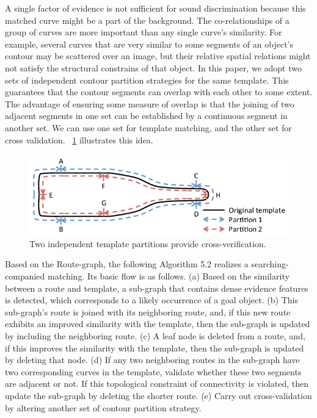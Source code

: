 \documentclass{article}
\begin{document}
A single factor of evidence is not sufficient for sound discrimination because this matched curve might be a part of the background. 
The co-relationships of a group of curves are more important than any single curve's similarity. 
For example, several curves that are very similar to some segments of an object's contour may be scattered over an image, but their relative spatial relations might not satisfy the structural constrains of that object. 
In this paper, we adopt two sets of independent contour partition strategies for the same template. This guarantees that the contour segments can overlap with each other to some extent. The advantage of ensuring some measure of overlap is that the joining of two adjacent segments in one set can be established by a continuous segment in another set.
We can use one set for template matching, and the other set for cross validation. 
\figurename~\ref{fig:16} illustrates this idea.

\begin{figure}[!t]
\centering
\includegraphics[width=0.7\linewidth]{images/fig16.png}
\caption{Two independent template partitions provide cross-verification.}
\label{fig:16}
\end{figure}

Based on the Route-graph, the following Algorithm 5.2 realizes a searching-companied matching. 
Its basic flow is as follows. 
(a) Based on the similarity between a route and template, 
a sub-graph that contains dense evidence features is detected, 
which corresponds to a likely occurrence of a goal object. 
(b) This sub-graph's route is joined with its neighboring route, 
and, if this new route exhibits an improved similarity with the template, 
then the sub-graph is updated by including the neighboring route. 
(c) A leaf node is deleted from a route, 
and, if this improves the similarity with the template, 
then the sub-graph is updated by deleting that node. 
(d) If any two neighboring routes in the sub-graph have two corresponding curves in the template, 
validate whether these two segments are adjacent or not. 
If this topological constraint of connectivity is violated, 
then update the sub-graph by deleting the shorter route. 
(e) Carry out cross-validation by altering another set of contour partition strategy.
\end{document}
